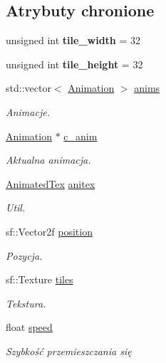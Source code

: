 \subsection*{Atrybuty chronione}
\begin{DoxyCompactItemize}
\item 
\hypertarget{class_entity_ae9986b41f6b347a36c9692c30e6cb5e7}{unsigned int {\bfseries tile\-\_\-width} = 32}\label{class_entity_ae9986b41f6b347a36c9692c30e6cb5e7}

\item 
\hypertarget{class_entity_aa6c74732076834899b7e3a05744a2109}{unsigned int {\bfseries tile\-\_\-height} = 32}\label{class_entity_aa6c74732076834899b7e3a05744a2109}

\item 
std\-::vector$<$ \hyperlink{class_animation}{Animation} $>$ \hyperlink{class_entity_adca44d97840ac7cff2d91d4d518edbcf}{anims}
\begin{DoxyCompactList}\small\item\em Animacje. \end{DoxyCompactList}\item 
\hyperlink{class_animation}{Animation} $\ast$ \hyperlink{class_entity_a60767e4984ab5817623a970f40c51591}{c\-\_\-anim}
\begin{DoxyCompactList}\small\item\em Aktualna animacja. \end{DoxyCompactList}\item 
\hyperlink{class_animated_tex}{Animated\-Tex} \hyperlink{class_entity_ad968b2c732af4a7087842f31202438fc}{anitex}
\begin{DoxyCompactList}\small\item\em Util. \end{DoxyCompactList}\item 
sf\-::\-Vector2f \hyperlink{class_entity_afc349ec89c2bffef70bf6a1d95603154}{position}
\begin{DoxyCompactList}\small\item\em Pozycja. \end{DoxyCompactList}\item 
sf\-::\-Texture \hyperlink{class_entity_a50a3dffcf26eb1950587414663951267}{tiles}
\begin{DoxyCompactList}\small\item\em Tekstura. \end{DoxyCompactList}\item 
float \hyperlink{class_entity_a1de3d8d9ab8088f61e6726069b26fa60}{speed}
\begin{DoxyCompactList}\small\item\em Szybkość przemieszczania się \end{DoxyCompactList}\item 

\end{DoxyCompactItemize}
